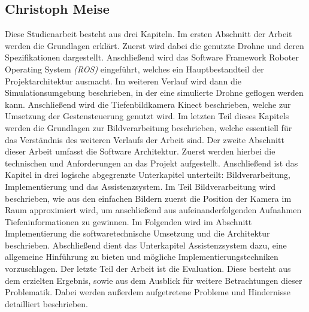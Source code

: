 \subsection*{Christoph Meise}
Diese Studienarbeit besteht aus drei Kapiteln. Im ersten Abschnitt der Arbeit werden die Grundlagen erklärt. Zuerst wird dabei die genutzte Drohne und deren Spezifikationen dargestellt. \newline
Anschließend wird das Software Framework Roboter Operating System \emph{(ROS)} eingeführt, welches ein Hauptbestandteil der Projektarchitektur ausmacht.\newline
Im weiteren Verlauf wird dann die Simulationsumgebung beschrieben, in der eine simulierte Drohne geflogen werden kann. Anschließend wird die Tiefenbildkamera Kinect beschrieben, welche zur Umsetzung der Gestensteuerung genutzt wird. Im letzten Teil dieses Kapitels werden die Grundlagen zur Bildverarbeitung beschrieben, welche essentiell für das Verständnis des weiteren Verlaufs der Arbeit sind. \newline
Der zweite Abschnitt dieser Arbeit umfasst die Software Architektur. Zuerst werden hierbei die technischen und Anforderungen an das Projekt aufgestellt. Anschließend ist das Kapitel in drei logische abgegrenzte Unterkapitel unterteilt: Bildverarbeitung, Implementierung und das Assistenzsystem. \newline
Im Teil Bildverarbeitung wird beschrieben, wie aus den einfachen Bildern zuerst die Position der Kamera im Raum approximiert wird, um anschließend aus aufeinanderfolgenden Aufnahmen Tiefeninformationen zu gewinnen. \newline
Im Folgenden wird im Abschnitt Implementierung die softwaretechnische Umsetzung und die Architektur beschrieben. Abschließend dient das Unterkapitel Assistenzsystem dazu, eine allgemeine Hinführung zu bieten und mögliche Implementierungstechniken vorzuschlagen. \newline
Der letzte Teil der Arbeit ist die Evaluation. Diese besteht aus dem erzielten Ergebnis, sowie aus dem Ausblick für weitere Betrachtungen dieser Problematik. Dabei werden außerdem aufgetretene Probleme und Hindernisse detailliert beschrieben.

